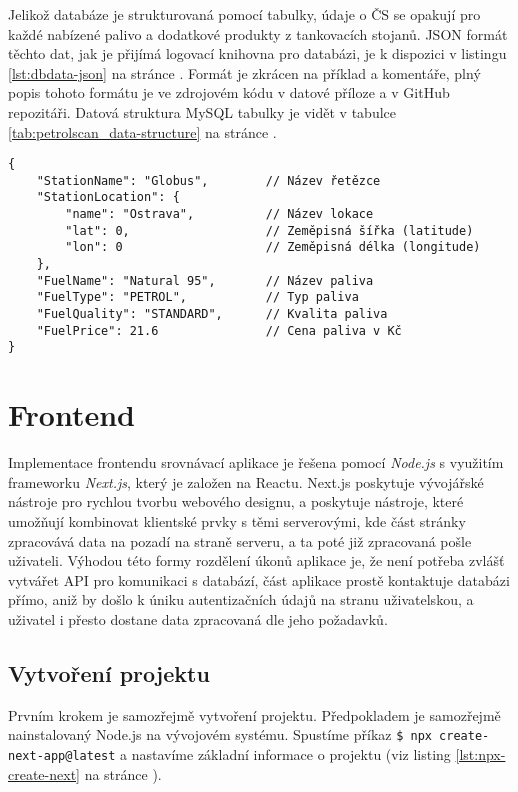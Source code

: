 Jelikož databáze je strukturovaná pomocí tabulky, údaje o ČS se opakují
pro každé nabízené palivo a dodatkové produkty z tankovacích stojanů.
JSON formát těchto dat, jak je přijímá logovací knihovna pro databázi,
je k dispozici v listingu \ref{lst:dbdata-json}
na stránce \pageref{lst:dbdata-json}. Formát je zkrácen na příklad
a komentáře, plný popis tohoto formátu je ve zdrojovém kódu v datové příloze
a v GitHub repozitáři. Datová struktura MySQL tabulky je vidět
v tabulce \ref{tab:petrolscan_data-structure}
na stránce \pageref{tab:petrolscan_data-structure}.

\begin{lstlisting}[caption={JSON formát dat pro logovací knihovnu},label=lst:dbdata-json]
{
    "StationName": "Globus",        // Název řetězce
    "StationLocation": {
        "name": "Ostrava",          // Název lokace
        "lat": 0,                   // Zeměpisná šířka (latitude)
        "lon": 0                    // Zeměpisná délka (longitude)
    },
    "FuelName": "Natural 95",       // Název paliva
    "FuelType": "PETROL",           // Typ paliva
    "FuelQuality": "STANDARD",      // Kvalita paliva
    "FuelPrice": 21.6               // Cena paliva v Kč
}
\end{lstlisting}

\section{Frontend}
\label{sec:development-frontend}

Implementace frontendu srovnávací aplikace je řešena pomocí \emph{Node.js}
s využitím frameworku \emph{Next.js}, který je založen na Reactu. Next.js
poskytuje vývojářské nástroje pro rychlou tvorbu webového designu, a poskytuje
nástroje, které umožňují kombinovat klientské prvky s těmi serverovými,
kde část stránky zpracovává data na pozadí na straně serveru, a ta poté již
zpracovaná pošle uživateli. Výhodou této formy rozdělení úkonů aplikace je,
že není potřeba zvlášť vytvářet API pro komunikaci s databází, část aplikace
prostě kontaktuje databázi přímo, aniž by došlo k úniku autentizačních
údajů na stranu uživatelskou, a uživatel i přesto dostane data zpracovaná
dle jeho požadavků.

\subsection{Vytvoření projektu}

Prvním krokem je samozřejmě vytvoření projektu. Předpokladem je samozřejmě
nainstalovaný Node.js na vývojovém systému. Spustíme příkaz
\texttt{\$ npx create-next-app@latest} a nastavíme základní informace
o projektu (viz listing \ref{lst:npx-create-next} na stránce
\pageref{lst:npx-create-next}).

